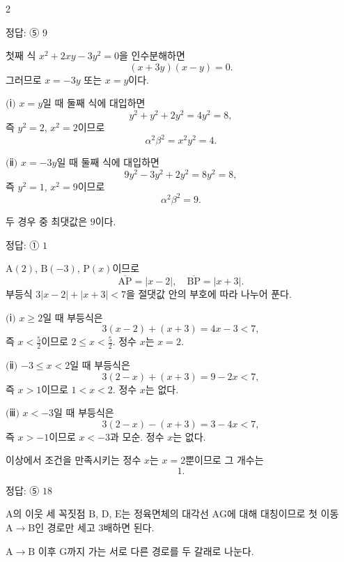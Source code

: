 \documentclass[10pt]{article}
\begin{document}
\begin{multicols}{2}
\begin{answerbox}정답: ⑤ $9$\end{answerbox}

첫째 식 $x^2 + 2xy - 3y^2 = 0$을 인수분해하면
\[ (x + 3y)(x - y) = 0. \]
그러므로 $x = -3y$ 또는 $x = y$이다.

$(\!$ⅰ$)$ $x = y$일 때 둘째 식에 대입하면
\[ y^2 + y^2 + 2y^2 = 4y^2 = 8, \]
즉 $y^2 = 2$, $x^2 = 2$이므로
\[ \alpha^2 \beta^2 = x^2 y^2 = 4. \]

$(\!$ⅱ$)$ $x = -3y$일 때 둘째 식에 대입하면
\[ 9y^2 - 3y^2 + 2y^2 = 8y^2 = 8, \]
즉 $y^2 = 1$, $x^2 = 9$이므로
\[ \alpha^2 \beta^2 = 9. \]

두 경우 중 최댓값은 $9$이다.

\begin{answerbox}정답: ① $1$\end{answerbox}

$\mathrm{A}(2)$, $\mathrm{B}(-3)$, $\mathrm{P}(x)$이므로
\[ \overline{\mathrm{AP}} = |x - 2|,\quad \overline{\mathrm{BP}} = |x + 3|. \]
부등식 $3|x-2| + |x+3| < 7$을 절댓값 안의 부호에 따라 나누어 푼다.

$(\!$ⅰ$)$ $x \ge 2$일 때 부등식은
\[ 3(x-2) + (x+3) = 4x - 3 < 7, \]
즉 $x < \tfrac{5}{2}$이므로 $2 \le x < \tfrac{5}{2}$. 정수 $x$는 $x = 2$.

$(\!$ⅱ$)$ $-3 \le x < 2$일 때 부등식은
\[ 3(2-x) + (x+3) = 9 - 2x < 7, \]
즉 $x > 1$이므로 $1 < x < 2$. 정수 $x$는 없다.

$(\!$ⅲ$)$ $x < -3$일 때 부등식은
\[ 3(2-x) - (x+3) = 3 - 4x < 7, \]
즉 $x > -1$이므로 $x < -3$과 모순. 정수 $x$는 없다.

이상에서 조건을 만족시키는 정수 $x$는 $x = 2$뿐이므로 그 개수는
\[ 1. \]

\begin{answerbox}정답: ⑤ $18$\end{answerbox}

\cubeIso

$\mathrm{A}$의 이웃 세 꼭짓점 $\mathrm{B}$, $\mathrm{D}$, $\mathrm{E}$는 정육면체의 대각선 $\mathrm{A}\mathrm{G}$에 대해 대칭이므로 첫 이동 $\mathrm{A} \to \mathrm{B}$인 경로만 세고 $3$배하면 된다.

$\mathrm{A} \to \mathrm{B}$ 이후 $\mathrm{G}$까지 가는 서로 다른 경로를 두 갈래로 나눈다.


\end{multicols}
\end{document}
